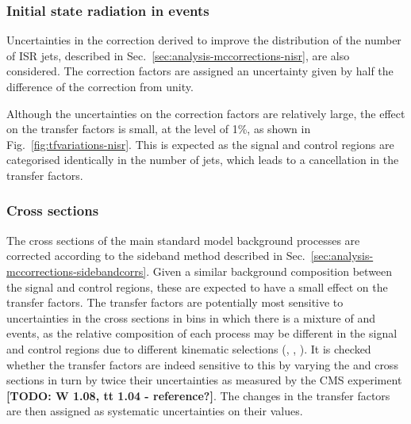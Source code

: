 
\subsubsection{Initial state radiation in \ttbar events}
Uncertainties in the correction derived to improve the distribution of the 
number of ISR jets, described in Sec.~\ref{sec:analysis-mccorrections-nisr}, 
are also considered. The correction factors are assigned an uncertainty given 
by half the difference of the correction from unity.

Although the uncertainties on the correction factors are relatively large, the 
effect on the transfer factors is small, at the level of 1\%, as shown in 
Fig.~\ref{fig:tfvariations-nisr}. This is expected as the signal and control 
regions are categorised identically in the number of jets, which leads to a 
cancellation in the transfer factors.

\subsubsection{Cross sections}
The cross sections of the main standard model background processes are 
corrected according to the \mht sideband method described in 
Sec.~\ref{sec:analysis-mccorrections-sidebandcorrs}. Given a similar background 
composition between the signal and control regions, these are expected to have 
a small effect on the transfer factors. The \Tmutottw transfer factors are 
potentially most sensitive to uncertainties in the cross sections in bins in 
which there is a mixture of \wlj and \ttbar events, as the relative composition 
of each process may be different in the signal and control regions due to 
different kinematic selections (\alphat, \bdphi, \mt). It is checked whether 
the transfer factors are indeed sensitive to this by varying the \wj and \ttbar 
cross sections in turn by twice their uncertainties as measured by the CMS 
experiment \textbf{[TODO: W 1.08, tt 1.04 - reference?]}. The changes in the 
transfer 
factors are then assigned as systematic uncertainties on their values.

